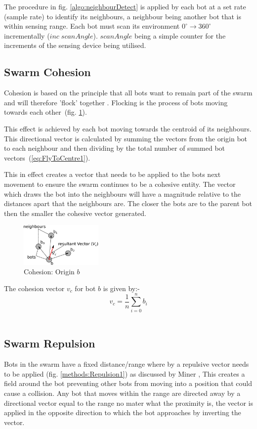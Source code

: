 \documentclass[10pt,journal,letterpaper,twoside]{IEEEtran}
\newcommand{\Fig}{fig.}
\begin{document}
The procedure in \Fig{} \ref{algo:neighbourDetect} is applied by each
bot at a set rate (sample rate) to identify its neighbours, a
neighbour being another bot that is within sensing range. Each bot
must scan its environment $0^\circ \rightarrow 360^\circ$
incrementally ($inc\; scanAngle$). $scanAngle$ being a simple counter
for the increments of the sensing device being utilised.

\subsection{Swarm Cohesion}
Cohesion is based on the principle that all bots want to remain part
of the swarm and will therefore 'flock' together
\cite{VGKP04}. Flocking is the process of bots moving towards each
other~(\Fig{} \ref{methods:FlyToCentre1}).

This effect is achieved by each bot moving towards the centroid of its
neighbours. This directional vector is calculated by summing the
vectors from the origin bot to each neighbour and then dividing by the
total number of summed bot vectors~(\ref{eq:FlyToCentre1}).

This in effect creates a vector that needs to be applied to the bots
next movement to ensure the swarm continues to be a cohesive
entity. The vector which draws the bot into the neighbours will have a
magnitude relative to the distances apart that the neighbours are. The
closer the bots are to the parent bot then the smaller the cohesive
vector generated.

\begin{figure}[H]
\begin{center}
\includegraphics[width=4cm]{figures/FlyToCentre1}
\end{center}
\caption{Cohesion: Origin $b$ \label{methods:FlyToCentre1}}
\end{figure}

The cohesion vector $v_{c}$ for bot $b$ is given by:-
\begin{equation}\label{eq:FlyToCentre1}
v_{c} = \frac{1}{n}{ \sum_{i=0}^{n}} b_i
\end{equation}‎

\subsection{Swarm Repulsion}
Bots in the swarm have a fixed distance/range where by a repulsive
vector needs to be applied (\Fig{} \ref{methods:Repulsion1}) as
discussed by Miner \cite{MD07}, This creates a field around the bot
preventing other bots from moving into a position that could cause a
collision. Any bot that moves within the range are directed away by a
directional vector equal to the range no mater what the proximity is,
the vector is applied in the opposite direction to which the bot
approaches by inverting the vector.
\end{document}
